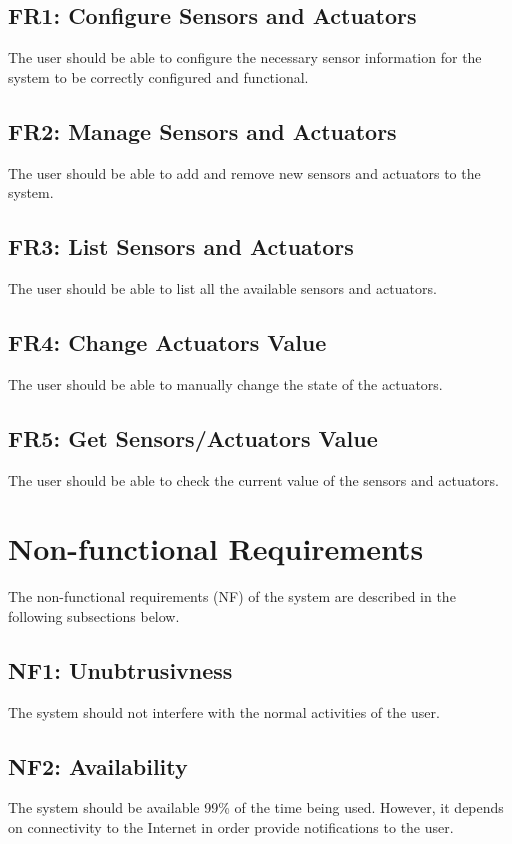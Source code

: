 \subsection{FR1: Configure Sensors and Actuators}
The user should be able to configure the necessary sensor information for the system to be correctly configured and functional.

\subsection{FR2: Manage Sensors and Actuators} 
The user should be able to add and remove new sensors and actuators to the system.

\subsection{FR3: List Sensors and Actuators} 
The user should be able to list all the available sensors and actuators.

\subsection{FR4: Change Actuators Value } 
The user should be able to manually change the state of the actuators. 

\subsection{FR5: Get Sensors/Actuators Value } 
The user should be able to check the current value of the sensors and actuators.

\section{Non-functional Requirements}

The non-functional requirements (NF) of the system are described in the following subsections below.

\subsection{NF1: Unubtrusivness}
The system should not interfere with the normal activities of the user.

\subsection{NF2: Availability}
The system should be available 99\% of the time being used. However, it depends on connectivity to the Internet in order provide notifications to the user.

